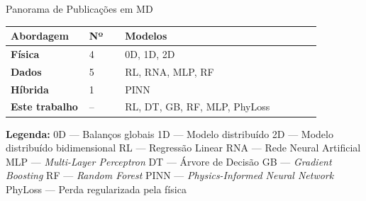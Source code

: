 \begin{slide}{Panorama de Publicações em MD}
  \small
  \centering
  \begin{tabular}{p{0.22\linewidth} p{0.10\linewidth} p{0.55\linewidth}}
    \toprule
    \textbf{Abordagem} & \textbf{Nº} & \textbf{Modelos} \\
    \midrule
    \textbf{Física} & 4 & 0D, 1D, 2D \\
    \midrule
    \textbf{Dados} & 5 & RL, RNA, MLP, RF \\
    \midrule
    \textbf{Híbrida} & 1 & PINN \\
    \midrule
    \textbf{Este trabalho} & -- & RL, DT, GB, RF, MLP, PhyLoss \\
    \bottomrule
  \end{tabular}
  \vfill
  \centering\scriptsize
  \textbf{Legenda:}
  0D — Balanços globais \;
  1D — Modelo distribuído \;
  2D — Modelo distribuído bidimensional \;
  RL — Regressão Linear \;
  RNA — Rede Neural Artificial \;
  MLP — \textit{Multi-Layer Perceptron} \;
  DT — Árvore de Decisão \;
  GB — \textit{Gradient Boosting} \;
  RF — \textit{Random Forest} \;
  PINN — \textit{Physics-Informed Neural Network} \;
  PhyLoss — Perda regularizada pela física
\end{slide}

